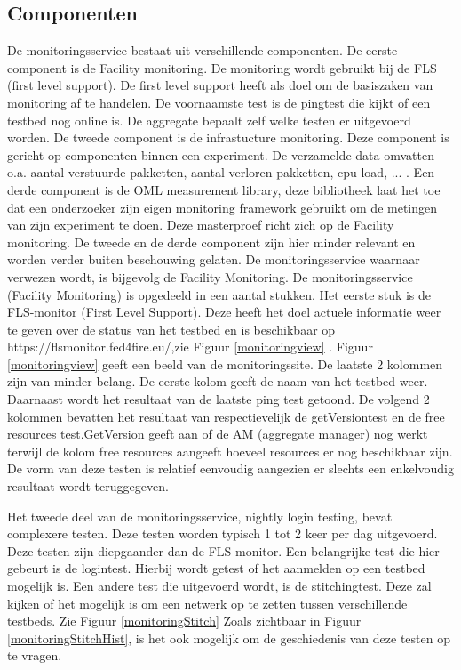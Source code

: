 \subsection{Componenten}
\npar
De monitoringsservice bestaat uit verschillende componenten. De eerste component is de Facility monitoring. De monitoring wordt gebruikt bij de FLS (first level support). De first level support heeft als doel om de basiszaken van monitoring af te handelen. De voornaamste test is de pingtest die kijkt of een testbed nog online is. De aggregate bepaalt zelf welke testen er uitgevoerd worden.
\clearpage
\npar
De tweede component is de infrastucture monitoring. Deze component is gericht op componenten binnen een experiment. De verzamelde data omvatten o.a. aantal verstuurde pakketten, aantal verloren pakketten, cpu-load, ... .
\npar
Een derde component is de OML measurement library, deze bibliotheek laat het toe dat een onderzoeker zijn eigen monitoring framework gebruikt om de metingen van zijn experiment te doen.
\npar
Deze masterproef richt zich op de Facility monitoring. De tweede en de derde component zijn hier minder relevant en worden verder buiten beschouwing gelaten. De monitoringsservice waarnaar verwezen wordt, is bijgevolg de Facility Monitoring.
\npar
De monitoringsservice (Facility Monitoring) is opgedeeld in een aantal stukken. Het eerste stuk is de FLS-monitor (First Level Support). Deze heeft het doel actuele informatie weer te geven over de status van het testbed en is beschikbaar op https://flsmonitor.fed4fire.eu/,zie  Figuur \ref{monitoringview} .
\npar
Figuur \ref{monitoringview} geeft een beeld van de monitoringssite. De laatste 2 kolommen zijn van minder belang. De eerste kolom geeft de naam van het testbed weer. Daarnaast wordt het resultaat van de laatste ping test getoond. De volgend 2 kolommen bevatten het resultaat van respectievelijk de getVersiontest en de free resources test.GetVersion geeft aan of de AM (aggregate manager) nog werkt terwijl de kolom free resources aangeeft hoeveel resources er nog beschikbaar zijn. De vorm van deze testen is relatief eenvoudig aangezien er slechts een enkelvoudig resultaat wordt teruggegeven.

\clearpage
\npar
Het tweede deel van de monitoringsservice, nightly login testing, bevat complexere testen. Deze testen worden typisch 1 tot 2 keer per dag uitgevoerd. Deze testen zijn diepgaander dan de FLS-monitor. Een belangrijke test die hier gebeurt is de logintest. Hierbij wordt getest of het aanmelden op een testbed mogelijk is. Een andere test die uitgevoerd wordt, is de stitchingtest. Deze zal kijken of het mogelijk is om een netwerk op te zetten tussen verschillende testbeds. Zie Figuur \ref{monitoringStitch}
Zoals zichtbaar in Figuur \ref{monitoringStitchHist}, is het ook mogelijk om de geschiedenis van deze testen op te vragen. 
\clearpage

